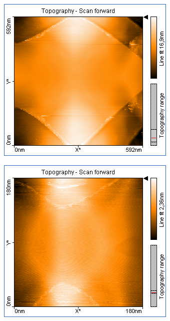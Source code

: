 \centering
\begin{figure}
    \begin{subfigure}[b]{\picwidth}
        \includegraphics[width=\textwidth]{data/Graphit/pic_06_01_600nm}
        \caption{}
        \label{fig:graphit_06_01}
    \end{subfigure}\qquad
    \begin{subfigure}[b]{\picwidth}
        \includegraphics[width=\textwidth]{data/Graphit/pic_06_02_180nm}

\end{subfigure}
\end{figure}
